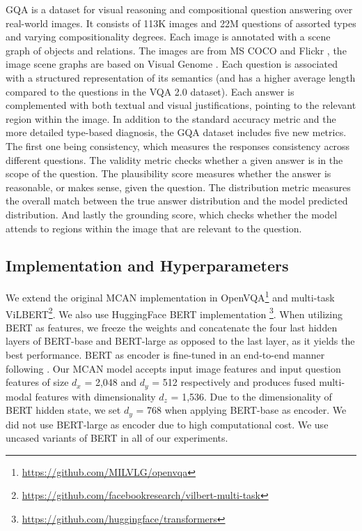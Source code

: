 \documentclass{article}
\begin{document}
GQA is a dataset \citet{hudson2019gqa} for visual reasoning and compositional question answering over real-world images. It consists of 113K images and 22M questions of assorted types and varying compositionality degrees. Each image is annotated with a scene graph of objects and relations. The images are from MS COCO \citep{coco} and Flickr \citep{thomee2016flickr}, the image scene graphs are based on Visual Genome \citep{krishnavisualgenome}. Each question is associated with a structured representation of its semantics (and has a higher average length compared to the questions in the VQA 2.0 dataset). Each answer is complemented with both textual and visual justifications, pointing to the relevant region within the image. In addition to the standard accuracy metric and the more detailed type-based diagnosis, the GQA dataset includes five new metrics. The first one being consistency, which measures the responses consistency across different questions. The validity metric checks whether a given answer is in the scope of the question. The plausibility score measures whether the answer is reasonable, or makes sense, given the question. The distribution metric measures the overall match between the true answer distribution and the model predicted distribution. And lastly the grounding score, which checks whether the model attends to regions within the image that are relevant to the question.

\subsection{Implementation and Hyperparameters}
We extend the original MCAN implementation in OpenVQA\footnote{\url{https://github.com/MILVLG/openvqa}} and multi-task ViLBERT\footnote{\url{https://github.com/facebookresearch/vilbert-multi-task}}. We also use HuggingFace BERT implementation \citep{wolf2019huggingfaces}\footnote{\url{https://github.com/huggingface/transformers}}. When utilizing BERT as features, %
we freeze the weights and concatenate the four last hidden layers of BERT-base and BERT-large as opposed to the last layer, as it yields the best performance. BERT as encoder is fine-tuned in an end-to-end manner following \citep{devlin-etal-2019-bert}. Our MCAN model accepts input image features and input question features of size $d_{x}$ = 2,048 and $d_{y}$ = 512 respectively and produces fused multi-modal features with dimensionality $d_{z}$ = 1,536. Due to the dimensionality of BERT hidden state, we set $d_{y}$ = 768 when applying BERT-base as encoder. We did not use BERT-large as encoder due to high computational cost. We use uncased variants of BERT in all of our experiments.
\end{document}
